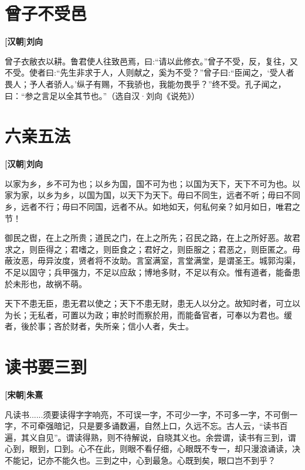 \documentclass[UTF8,titlepage,oneside]{ctexbook}
\begin{document}
\chapter*{曾子不受邑}
\begin{center}
	\textbf{[汉朝]刘向}
\end{center}


曾子衣敝衣以耕。鲁君使人往致邑焉，曰:“请以此修衣。”曾子不受，反，复往，又不受。使者曰:“先生非求于人，人则献之，奚为不受？”曾子曰:“臣闻之，‘受人者畏人；予人者骄人。’纵子有赐，不我骄也，我能勿畏乎？”终不受。孔子闻之，曰：“参之言足以全其节也。”（选自汉·刘向《说苑》）



\chapter*{六亲五法}
\begin{center}
	\textbf{[汉朝]刘向}
\end{center}


以家为乡，乡不可为也；以乡为国，国不可为也；以国为天下，天下不可为也。以家为家，以乡为乡，以国为国，以天下为天下。毋曰不同生，远者不听；毋曰不同乡，远者不行；毋曰不同国，远者不从。如地如天，何私何亲？如月如日，唯君之节！


御民之辔，在上之所贵；道民之门，在上之所先；召民之路，在上之所好恶。故君求之，则臣得之；君嗜之，则臣食之；君好之，则臣服之；君恶之，则臣匿之。毋蔽汝恶，毋异汝度，贤者将不汝助。言室满室，言堂满堂，是谓圣王。城郭沟渠，不足以固守；兵甲强力，不足以应敌；博地多财，不足以有众。惟有道者，能备患於未形也，故祸不萌。


天下不患无臣，患无君以使之；天下不患无财，患无人以分之。故知时者，可立以为长；无私者，可置以为政；审於时而察於用，而能备官者，可奉以为君也。缓者，後於事；吝於财者，失所亲；信小人者，失士。



\chapter*{读书要三到}
\begin{center}
	\textbf{[宋朝]朱熹}
\end{center}

凡读书......须要读得字字响亮，不可误一字，不可少一字，不可多一字，不可倒一字，不可牵强暗记，只是要多诵数遍，自然上口，久远不忘。古人云，“读书百遍，其义自见”。谓读得熟，则不待解说，自晓其义也。余尝谓，读书有三到，谓心到，眼到，口到。心不在此，则眼不看仔细，心眼既不专一，却只漫浪诵读，决不能记，记亦不能久也。三到之中，心到最急。心既到矣，眼口岂不到乎？
\end{document}
